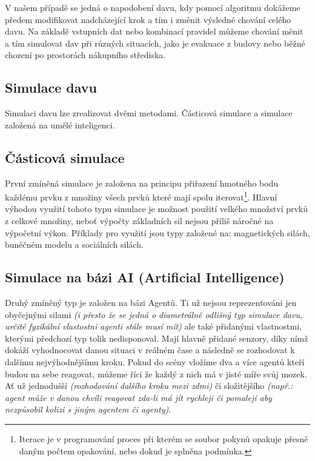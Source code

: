 \documentclass[czech,public,dept460,male,cpdeclaration]{diploma}
\begin{document}
V našem případě se jedná o napodobení davu, kdy pomocí algoritmu dokážeme předem modifikovat nadcházející krok a tím i změnit výsledné chování celého davu. Na základě vstupních dat nebo kombinací pravidel můžeme chování měnit a tím simulovat dav při různých situacích, jako je evakuace z budovy nebo běžné chození po prostorách nákupního střediska.

\subsection{Simulace davu}
Simulaci davu lze zrealizovat dvěmi metodami. Částicová simulace a simulace založená na umělé inteligenci. \cite{linkToBachelor1}

\subsection{Částicová simulace}
První zmíněná simulace je založena na principu přiřazení hmotného bodu každému prvku z množiny všech prvků které mají spolu iterovat\footnote{Iterace je v programování proces při kterém se soubor pokynů opakuje přesně daným počtem opakování, nebo dokud je splněna podmínka.\cite{linkToIteration}}. Hlavní výhodou využití tohoto typu simulace je možnost použití velkého množství prvků z celkové množiny, neboť výpočty základních sil nejsou příliš náročné na výpočetní výkon. Příklady pro využití jsou typy založené na: magnetických silách, buněčném modelu a sociálních silách. \cite{linkToBachelor1}

\subsection{Simulace na bázi AI (Artificial Intelligence)}\label{sec:simulace-na-bazi-ai-artificial-intelligence}
Druhý zmíněný typ je založen na bázi Agentů. Ti už nejsou reprezentováni jen obyčejnými silami \textit{(i přesto že se jedná o diametrálně odlišný typ simulace davu, určité fyzikální vlastostni agenti stále musí mít)} ale také přidanými vlastnostmi, kterými předchozí typ tolik nedisponoval. Mají hlavně přidané senzory, díky nímž dokáží vyhodnocovat danou situaci v reálném čase a následně se rozhodovat k dalšímu nejvýhodnějšímu kroku. Pokud do scény vložíme dva a více agentů kteří budou na sebe reagovat, můžeme říci že každý z nich má v jisté míře svůj mozek. Ať už jednodušší \textit{(rozhodování dalšího kroku mezi zdmi)} či složitějšího \textit{(např.: agent může v danou chvíli reagovat zda-li má jít rychleji či pomaleji aby nezpůsobil kolizi s jiným agentem či agenty)}.
\end{document}
